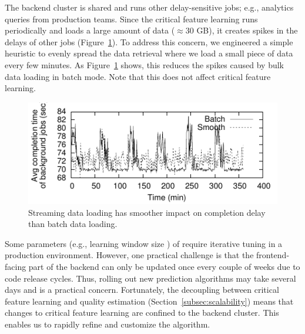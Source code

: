
The backend cluster is shared 
and runs other delay-sensitive 
jobs; e.g.,  analytics queries from production teams. 
 Since the critical feature learning runs periodically 
and loads a large amount of data ($\approx$30 
GB), it creates spikes in the delays of other jobs 
(Figure~\ref{fig:completion-delay}).  
To address this concern, we engineered a simple 
heuristic to evenly spread the data retrieval where  
we load a small piece of data every few minutes. 
As Figure~\ref{fig:completion-delay} shows, this 
reduces the spikes caused by bulk data loading in 
batch mode.
Note that this does not affect critical feature learning.


\begin{figure}[t!]
\centering
\includegraphics[width=.6\textwidth]{figures/cfa-smooth-batch-timeseries.pdf}
\caption{Streaming data loading has smoother 
impact on completion delay than batch data loading.}
\label{fig:completion-delay}
\end{figure}

Some parameters (e.g., learning window size 
\HTimeWindowLearn) of \dda require iterative tuning in a 
production environment.
However, one practical challenge is that the 
frontend-facing part of the backend can 
only  be updated once every couple of weeks 
due to code release cycles. 
Thus,  rolling out new prediction algorithms may 
take several days and is a practical concern.
Fortunately, the decoupling between critical feature 
learning and quality estimation 
(Section~\ref{subsec:scalability})
means that changes to critical feature learning
are confined to the backend cluster. 
This enables us to rapidly refine 
and customize the \dda algorithm. 

